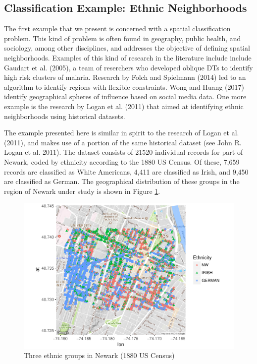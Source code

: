 \documentclass[]{elsarticle} %
\makeatletter
\def\maxwidth{\ifdim\Gin@nat@width>\linewidth\linewidth
\else\Gin@nat@width\fi}
\let\Oldincludegraphics\includegraphics
\renewcommand{\includegraphics}[1]{\Oldincludegraphics[width=\maxwidth]{#1}}
\makeatother
\begin{document}
\subsection{Classification Example: Ethnic
Neighborhoods}\label{classification-example-ethnic-neighborhoods}

The first example that we present is concerned with a spatial
classification problem. This kind of problem is often found in
geography, public health, and sociology, among other disciplines, and
addresses the objective of defining spatial neighborhoods. Examples of
this kind of research in the literature include include Gaudart et al.
(2005), a team of reserchers who developed oblique DTs to identify high
risk clusters of malaria. Research by Folch and Spielmann (2014) led to
an algorithm to identify regions with flexible constraints. Wong and
Huang (2017) identify geographical spheres of influence based on social
media data. One more example is the research by Logan et al. (2011) that
aimed at identifying ethnic neighborhoods using historical datasets.

The example presented here is similar in spirit to the research of Logan
et al. (2011), and makes use of a portion of the same historical dataset
(see John R. Logan et al. 2011). The dataset consists of 21520
individual records for part of Newark, coded by ethnicity according to
the 1880 US Census. Of these, 7,659 records are classified as White
Americans, 4,411 are classified as Irish, and 9,450 are classified as
German. The geographical distribution of these groups in the region of
Newark under study is shown in Figure \ref{fig:fig11-map-newark}.

\begin{figure}[htbp]
\centering
\includegraphics{Trees_with_Base_Functions_files/figure-latex/fig11-map-newark-1.pdf}
\caption{\label{fig:fig11-map-newark}Three ethnic groups in Newark (1880
US Census)}
\end{figure}
\end{document}
